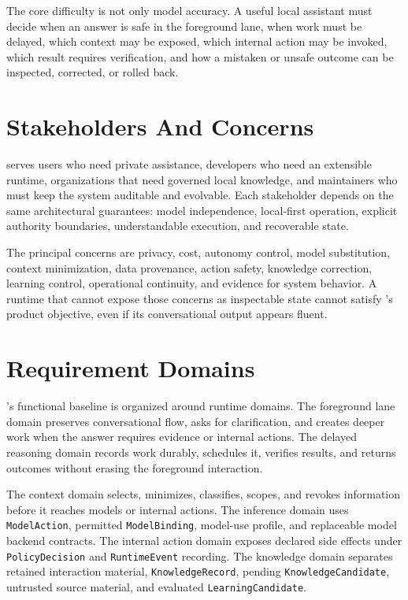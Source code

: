 The core difficulty is not only model accuracy. A useful local assistant must decide when an answer is safe in the foreground lane, when work must be delayed, which context may be exposed, which internal action may be invoked, which result requires verification, and how a mistaken or unsafe outcome can be inspected, corrected, or rolled back.

\section{Stakeholders And Concerns}

\Madre serves users who need private assistance, developers who need an extensible runtime, organizations that need governed local knowledge, and maintainers who must keep the system auditable and evolvable. Each stakeholder depends on the same architectural guarantees: model independence, local-first operation, explicit authority boundaries, understandable execution, and recoverable state.

The principal concerns are privacy, cost, autonomy control, model substitution, context minimization, data provenance, action safety, knowledge correction, learning control, operational continuity, and evidence for system behavior. A runtime that cannot expose those concerns as inspectable state cannot satisfy \Madre's product objective, even if its conversational output appears fluent.

\section{Requirement Domains}

\Madre's functional baseline is organized around runtime domains. The foreground lane domain preserves conversational flow, asks for clarification, and creates deeper work when the answer requires evidence or internal actions. The delayed reasoning domain records work durably, schedules it, verifies results, and returns outcomes without erasing the foreground interaction.

The context domain selects, minimizes, classifies, scopes, and revokes information before it reaches models or internal actions. The inference domain uses \texttt{ModelAction}, permitted \texttt{ModelBinding}, model-use profile, and replaceable model backend contracts. The internal action domain exposes declared side effects under \texttt{PolicyDecision} and \texttt{RuntimeEvent} recording. The knowledge domain separates retained interaction material, \texttt{KnowledgeRecord}, pending \texttt{KnowledgeCandidate}, untrusted source material, and evaluated \texttt{LearningCandidate}.

